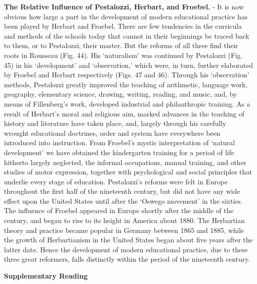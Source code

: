 \documentclass[
]{book}
\begin{document}
\textbf{The Relative Influence of Pestalozzi, Herbart, and Froebel.} - It is now obvious how large a part in the development of modern educational practice has been played by Herbart and Froebel. There are few tendencies in the curricula and methods of the schools today that cannot in their beginnings be traced back to them, or to Pestalozzi, their master. But the reforms of all three find their roots in Rousseau (Fig. 44). His `naturalism' was continued by Pestalozzi (Fig. 45) in his `development' and `observation,' which were, in turn, further elaborated by Froebel and Herbart respectively (Figs. 47 and 46). Through his `observation' methods, Pestalozzi greatly improved the teaching of arithmetic, language work, geography, elementary science, drawing, writing, reading, and music, and, by means of Fillenberg's work, developed industrial and philanthropic training. As a result of Herbart's moral and religious aim, marked advances in the teaching of history and literature have taken place, and, largely through his carefully wrought educational doctrines, order and system have everywhere been introduced into instruction. From Froebel's mystic interpretation of `natural development' we have obtained the kindergarten training for a period of life hitherto largely neglected, the informal occupations, manual training, and other studies of motor expression, together with psychological and social principles that underlie every stage of education. Pestalozzi's reforms were felt in Europe throughout the first half of the nineteenth century, but did not have any wide effect upon the United States until after the `Oswego movement' in the sixties. The influence of Froebel appeared in Europe shortly after the middle of the century, and began to rise to its height in America about 1880. The Herbartian theory and practice became popular in Germany between 1865 and 1885, while the growth of Herbartianism in the United States began about five years after the latter date. Hence the development of modern educational practice, due to these three great reformers, falls distinctly within the period of the nineteenth century.

\textbf{Supplementary Reading}
\end{document}
